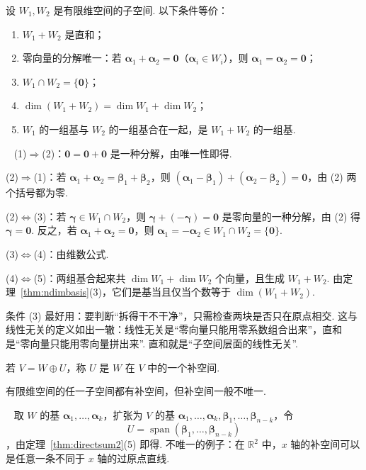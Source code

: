 \documentclass[lang=cn,10.5pt,scheme=chinese,toc=twocol,section,chinesefont=nofont,
twoside,citestyle=gb7714-2015,bibstyle=gb7714-2015]{elegantbook}
\DeclareRobustCommand{\textbf}[1]{{\lnsemiboldlatin\lnsemiboldcjk #1}}
\newcommand{\vv}[1]{\boldsymbol{#1}}
\newcommand{\zero}{\boldsymbol{0}}          %
\numberwithin{equation}{section}   %
\newcommand{\spn}{\operatorname{span}}      %
\newcommand*{\lnlabel}[1]{{\sffamily\bfseries\color{black}#1}}
\renewenvironment{proof}{%
	\par\noindent\lnlabel{\proofname}\;\ \color{black!90}\cfs}{\par}
\begin{document}
\begin{theorem}
  \label{thm:directsum2}
  设 $W_1,W_2$ 是有限维空间的子空间. 以下条件等价：
  \begin{enumerate}
    \item $W_1+W_2$ 是直和；
    \item 零向量的分解唯一：若 $\vv\alpha_1+\vv\alpha_2=\zero$（$\vv\alpha_i\in W_i$），则 $\vv\alpha_1=\vv\alpha_2=\zero$；
    \item $W_1\cap W_2=\{\zero\}$；
    \item $\dim(W_1+W_2)=\dim W_1+\dim W_2$；
    \item $W_1$ 的一组基与 $W_2$ 的一组基合在一起，是 $W_1+W_2$ 的一组基.
  \end{enumerate}
\end{theorem}
\begin{proof}
  (1)$\Rightarrow$(2)：$\zero=\zero+\zero$ 是一种分解，由唯一性即得.

  (2)$\Rightarrow$(1)：若 $\vv\alpha_1+\vv\alpha_2=\vv\beta_1+\vv\beta_2$，则 $(\vv\alpha_1-\vv\beta_1)+(\vv\alpha_2-\vv\beta_2)=\zero$，由 (2) 两个括号都为零.

  (2)$\Leftrightarrow$(3)：若 $\vv\gamma\in W_1\cap W_2$，则 $\vv\gamma+(-\vv\gamma)=\zero$ 是零向量的一种分解，由 (2) 得 $\vv\gamma=\zero$. 反之，若 $\vv\alpha_1+\vv\alpha_2=\zero$，则 $\vv\alpha_1=-\vv\alpha_2\in W_1\cap W_2=\{\zero\}$.

  (3)$\Leftrightarrow$(4)：由维数公式.

  (4)$\Leftrightarrow$(5)：两组基合起来共 $\dim W_1+\dim W_2$ 个向量，且生成 $W_1+W_2$. 由定理~\ref{thm:ndimbasis}(3)，它们是基当且仅当个数等于 $\dim(W_1+W_2)$.
\end{proof}

\begin{motivebox}
  条件 (3) 最好用：要判断“拆得干不干净”，只需检查两块是否只在原点相交. 这与线性无关的定义如出一辙：线性无关是“零向量只能用零系数组合出来”，直和是“零向量只能用零向量拼出来”. 直和就是“子空间层面的线性无关”.
\end{motivebox}

\begin{definition}
  若 $V=W\oplus U$，称 $U$ 是 $W$ 在 $V$ 中的一个\textbf{补空间}.
\end{definition}

\begin{proposition}
  有限维空间的任一子空间都有补空间，但补空间一般不唯一.
\end{proposition}
\begin{proof}
  取 $W$ 的基 $\vv\alpha_1,\ldots,\vv\alpha_k$，扩张为 $V$ 的基 $\vv\alpha_1,\ldots,\vv\alpha_k,\vv\beta_1,\ldots,\vv\beta_{n-k}$，令 $$U=\spn(\vv\beta_1,\ldots,\vv\beta_{n-k})$$，由定理~\ref{thm:directsum2}(5) 即得. 不唯一的例子：在 $\mathbb{R}^2$ 中，$x$ 轴的补空间可以是任意一条不同于 $x$ 轴的过原点直线.
\end{proof}
\end{document}
